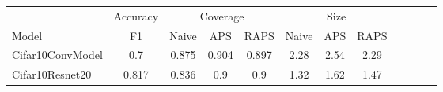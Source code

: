 \begin{table}[t] 
\centering 
\small 
\begin{tabular}{lccccccccccc} 
\toprule 
  & \multicolumn{1}{c}{Accuracy}  & \multicolumn{3}{c}{Coverage} & \multicolumn{3}{c}{Size}  \\ 
\cmidrule(r){2-2}  \cmidrule(r){3-5}  \cmidrule(r){6-8}  
Model & F1 & Naive & APS & RAPS & Naive & APS & RAPS  \\ 
\midrule 
 Cifar10ConvModel &  0.7 & 0.875 & 0.904 & 0.897 & 2.28 & 2.54 & 2.29 \\ 
 Cifar10Resnet20 &  0.817 & 0.836 & 0.9 & 0.9 & 1.32 & 1.62 & 1.47 \\ 
\bottomrule 
\end{tabular} 
\end{table} 
